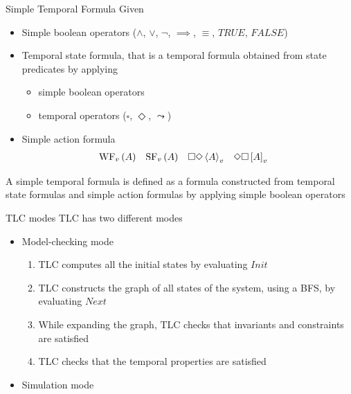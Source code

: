 \begin{frame}{Simple Temporal Formula}
    Given
    \begin{itemize}
        \item Simple boolean operators ($\land$, $\lor$, $\neg$, $\implies$, $\equiv$, $TRUE$, $FALSE$)
        \item Temporal state formula, that is a temporal formula obtained from state predicates by applying
        \begin{itemize}
            \item simple boolean operators
            \item temporal operators ($\square$, $\Diamond$, $\leadsto$)
        \end{itemize}
        \item Simple action formula\begin{align*}
            \textrm{WF}_v \left( A \right) &&
            \textrm{SF}_v \left( A \right) &&
            \square \Diamond \left< A \right>_v &&
            \Diamond \square \left[ A \right]_v &&
        \end{align*}
    \end{itemize}
    A simple temporal formula is defined as a formula constructed from temporal state formulas and simple action formulas by applying simple boolean operators
\end{frame}

\begin{frame}{TLC modes}
    TLC has two different modes
    \begin{itemize}
        \item<1-> Model-checking mode
         {
            \begin{enumerate}
                \item TLC computes all the initial states by evaluating $Init$
                \item TLC constructs the graph of all states of the system, using a BFS, by evaluating $Next$
                \item While expanding the graph, TLC checks that invariants and constraints are satisfied
                \item TLC checks that the temporal properties are satisfied
            \end{enumerate}
        }
        \item<2-> Simulation mode
    \end{itemize}
\end{frame}